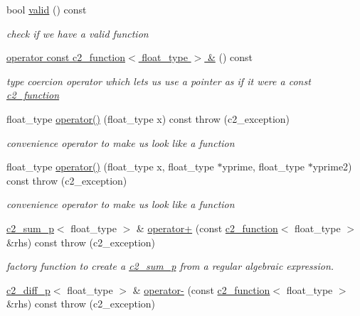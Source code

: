 \begin{DoxyCompactItemize}
bool \hyperlink{classc2__const__ptr_a658dc06f2a368d0fb0514b460d222863}{valid} () const 
\begin{DoxyCompactList}\small\item\em check if we have a valid function \end{DoxyCompactList}\item 
\hyperlink{classc2__const__ptr_a504b8baffa3de2180d200aa7bfcaaa3e}{operator const c2\+\_\+function$<$ float\+\_\+type $>$ \&} () const 
\begin{DoxyCompactList}\small\item\em type coercion operator which lets us use a pointer as if it were a const \hyperlink{classc2__function}{c2\+\_\+function} \end{DoxyCompactList}\item 
float\+\_\+type \hyperlink{classc2__const__ptr_a7c9a4582f4ddb5eee68a8ebbd14b4280}{operator()} (float\+\_\+type x) const   throw (c2\+\_\+exception)
\begin{DoxyCompactList}\small\item\em convenience operator to make us look like a function \end{DoxyCompactList}\item 
float\+\_\+type \hyperlink{classc2__const__ptr_accdc2e24cc09242d3ded1b7a22ae803e}{operator()} (float\+\_\+type x, float\+\_\+type $\ast$yprime, float\+\_\+type $\ast$yprime2) const   throw (c2\+\_\+exception)
\begin{DoxyCompactList}\small\item\em convenience operator to make us look like a function \end{DoxyCompactList}\item 
\hyperlink{classc2__sum__p}{c2\+\_\+sum\+\_\+p}$<$ float\+\_\+type $>$ \& \hyperlink{classc2__const__ptr_ad93bdeb0b0e78f31ce4fa4b83b38cf27}{operator+} (const \hyperlink{classc2__function}{c2\+\_\+function}$<$ float\+\_\+type $>$ \&rhs) const   throw (c2\+\_\+exception)
\begin{DoxyCompactList}\small\item\em factory function to create a \hyperlink{classc2__sum__p}{c2\+\_\+sum\+\_\+p} from a regular algebraic expression. \end{DoxyCompactList}\item 
\hyperlink{classc2__diff__p}{c2\+\_\+diff\+\_\+p}$<$ float\+\_\+type $>$ \& \hyperlink{classc2__const__ptr_ac2bc3992872343e2160040631ab43ffe}{operator-\/} (const \hyperlink{classc2__function}{c2\+\_\+function}$<$ float\+\_\+type $>$ \&rhs) const   throw (c2\+\_\+exception)

\end{DoxyCompactItemize}
